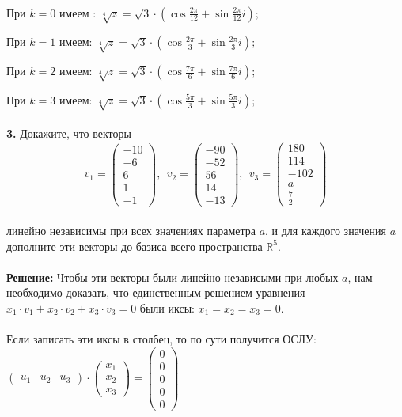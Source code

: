 \documentclass[a4paper, 12pt]{article}
\begin{document}
    \\
    \par При $k = 0$ имеем : $\sqrt[4]{z} = \sqrt{3} \cdot \left(\cos \frac{2 \pi}{12} + \sin \frac{2 \pi}{12} i\right);$
    \\
    \par При $k = 1$ имеем: $\sqrt[4]{z} = \sqrt{3} \cdot \left(\cos \frac{2 \pi}{3} + \sin \frac{2 \pi}{3} i\right);$
    \\
    \par При $k = 2$ имеем: $\sqrt[4]{z} = \sqrt{3} \cdot \left(\cos \frac{7 \pi}{6} + \sin \frac{7 \pi}{6} i\right);$
    \\
    \par При $k = 3$ имеем: $\sqrt[4]{z} = \sqrt{3} \cdot \left(\cos \frac{5 \pi}{3} + \sin \frac{5 \pi}{3} i\right);$
    \\
    \\ \textbf{3.} Докажите, что векторы
    \[
        v_1 = \begin{pmatrix}-10\\-6\\6\\1\\-1\end{pmatrix}, \ \ v_2 = \begin{pmatrix}-90\\-52\\56\\14\\-13\end{pmatrix}, \ \ v_3 = \begin{pmatrix}180\\114\\-102\\a\\\frac{7}{2}\end{pmatrix} 
    \]
    \\ линейно независимы при всех значениях параметра $a$, и для каждого значения $a$ дополните эти векторы до базиса
    всего пространства $\mathbb{R}^5$.
    \\
    \\ \textbf{Решение: } Чтобы эти векторы были линейно независыми при любых $a$, нам необходимо доказать, что единственным решением уравнения $x_1 \cdot v_1 + x_2 \cdot v_2 + x_3 \cdot v_3 = 0$ были иксы: $x_1 = x_2 = x_3 = 0$.
    \\
    \\ Если записать эти иксы в столбец, то по сути получится ОСЛУ: $\begin{pmatrix}u_1 & u_2 & u_3\end{pmatrix} \cdot \begin{pmatrix}x_1 \\ x_2 \\ x_3\end{pmatrix} = \begin{pmatrix}0 \\ 0 \\ 0 \\ 0 \\ 0\end{pmatrix}$
\end{document}

